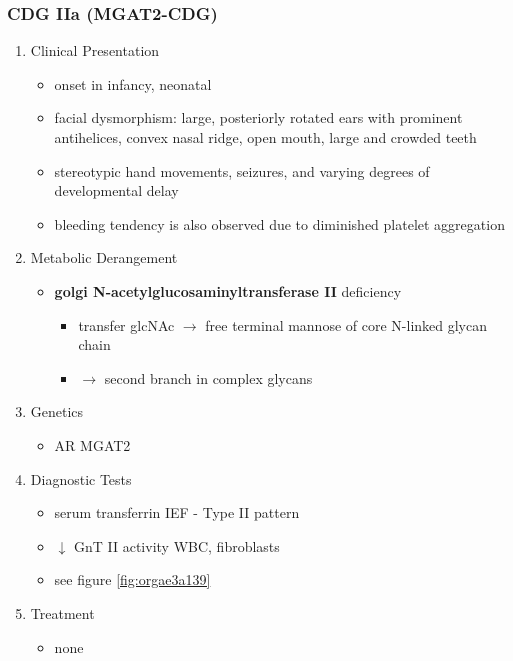 \documentclass[12pt]{scrartcl}
\begin{document}
\subsubsection{CDG IIa (MGAT2-CDG)}
\label{sec:org8e91ecd}
\begin{enumerate}
\item Clinical Presentation
\label{sec:orga7edac3}
\begin{itemize}
\item onset in infancy, neonatal
\item facial dysmorphism: large, posteriorly rotated ears with prominent
antihelices, convex nasal ridge, open mouth, large and crowded
teeth
\item stereotypic hand movements, seizures, and varying degrees of
developmental delay
\item bleeding tendency is also observed due to diminished platelet
aggregation
\end{itemize}

\item Metabolic Derangement
\label{sec:orgcbc2494}
\begin{itemize}
\item \textbf{golgi N-acetylglucosaminyltransferase II} deficiency
\begin{itemize}
\item transfer glcNAc \(\to\) free terminal mannose of core N-linked glycan chain
\item \(\to\) second branch in complex glycans
\end{itemize}
\end{itemize}
\item Genetics
\label{sec:org8c387f9}
\begin{itemize}
\item AR MGAT2
\end{itemize}
\item Diagnostic Tests
\label{sec:orgdbcbb36}
\begin{itemize}
\item serum transferrin IEF - Type II pattern
\item \(\downarrow\) GnT II activity WBC, fibroblasts
\item see figure \ref{fig:orgae3a139}
\end{itemize}
\item Treatment
\label{sec:org1c2d4dc}
\begin{itemize}
\item none
\end{itemize}
\end{enumerate}
\end{document}
